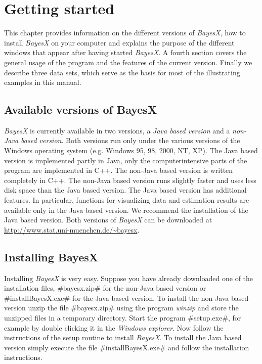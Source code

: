 \chapter{Getting started}
\label{gettingstarted}

This chapter provides information on the different versions of
{\em BayesX}, how to install {\em BayesX} on your computer and
explains the purpose of the different windows that appear after
having started {\em BayesX}. A fourth section covers the general
usage of the program and the features of the current version.
Finally we describe three data sets, which serve as the basis for
most of the illustrating examples in this manual.

\section{Available versions of BayesX}
\label{availableversions} 
 
  {\em
BayesX} is currently available in two versions, a {\em Java based
version} and a {\em non-Java based version}. Both versions run
only under the various versions of the Windows operating system
(e.g. Windows 95, 98, 2000, NT, XP). The Java based version is
implemented partly in Java, only the computerintensive parts of
the program are implemented in C++. The non-Java based version is
written completely in C++. The non-Java based version runs
slightly faster and uses less disk space than the Java based
version. The Java based version has additional features. In
particular, functions for visualizing data and estimation results
are available only in the Java based version. We recommend the
installation of the Java based version. Both versions of {\em
BayesX} can be downloaded at
\href{http://www.stat.uni-muenchen.de/~bayesx}
{http://www.stat.uni-muenchen.de/\~{}bayesx}.


\section{Installing BayesX}
  Installing
{\em BayesX} is very easy. Suppose you have already downloaded one
of the installation files, #bayesx.zip# for the non-Java based
version or #installBayesX.exe# for the Java based version. To
install the non-Java based version unzip  the file #bayesx.zip#
using the program {\em winzip} and store the unzipped files in a
temporary directory. Start the program #setup.exe#, for example by
double clicking it in the {\em Windows explorer}. Now follow the
instructions of the setup routine to install {\em BayesX}. To
install the Java based version simply execute the file
#installBayesX.exe# and follow the installation instructions.

